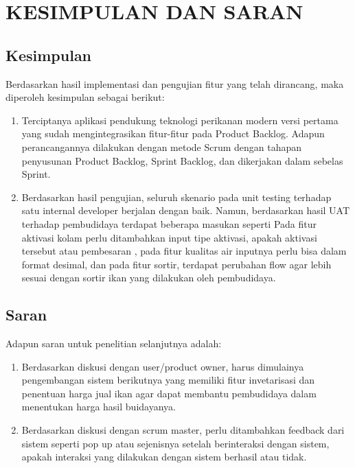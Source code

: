 
\chapter{KESIMPULAN DAN SARAN}

\section{Kesimpulan}
Berdasarkan hasil implementasi dan pengujian fitur yang telah dirancang, maka diperoleh kesimpulan sebagai berikut:

\begin{enumerate}
	\item Terciptanya aplikasi pendukung teknologi perikanan modern versi pertama yang sudah mengintegrasikan fitur-fitur pada Product Backlog. Adapun perancangannya dilakukan dengan metode Scrum dengan tahapan penyusunan Product Backlog, Sprint Backlog, dan dikerjakan dalam sebelas Sprint.
	
	\item Berdasarkan hasil pengujian, seluruh skenario pada unit testing terhadap satu internal developer berjalan dengan baik. Namun, berdasarkan hasil UAT terhadap pembudidaya terdapat beberapa masukan seperti Pada fitur aktivasi kolam perlu ditambahkan input tipe aktivasi, apakah aktivasi tersebut atau pembesaran , pada fitur kualitas air inputnya perlu bisa dalam format desimal, dan pada fitur sortir, terdapat perubahan flow agar lebih sesuai dengan sortir ikan yang dilakukan oleh pembudidaya.
\end{enumerate}

\section{Saran}
Adapun saran untuk penelitian selanjutnya adalah:
\begin{enumerate} 
	\item Berdasarkan diskusi dengan user/product owner, harus dimulainya pengembangan sistem berikutnya yang memiliki fitur invetarisasi dan penentuan harga jual ikan agar dapat membantu pembudidaya dalam menentukan harga hasil buidayanya.
	\item Berdasarkan diskusi dengan scrum master, perlu ditambahkan feedback dari sistem seperti pop up atau sejenisnya setelah berinteraksi dengan sistem, apakah interaksi yang dilakukan dengan sistem berhasil atau tidak.
\end{enumerate}


\begin{comment}

\end{comment}